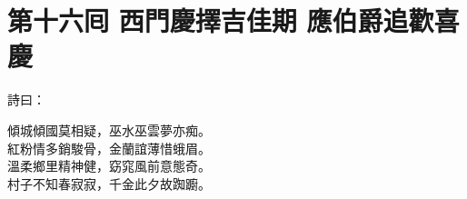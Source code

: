 
\chapter*{第十六囘 西門慶擇吉佳期 應伯爵追歡喜慶}


詩曰：

\begin{myquote}
傾城傾國莫相疑，巫水巫雲夢亦痴。\\紅粉情多銷駿骨，金蘭誼薄惜蛾眉。{}\\溫柔鄉里精神健，窈窕風前意態奇。\\村子不知春寂寂，千金此夕故踟躕。
\end{myquote}

